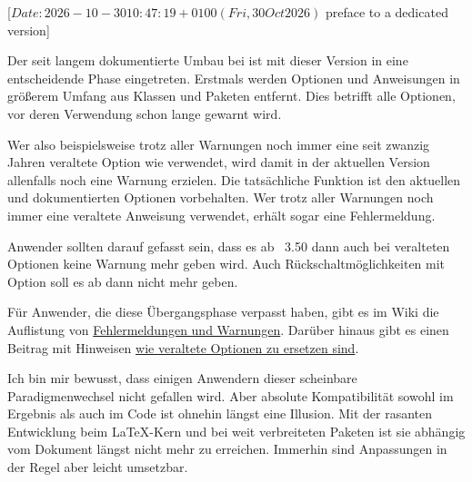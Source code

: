 %
%
%
%
%

                 [$Date: 2026-10-30 10:47:19 +0100 (Fri, 30 Oct 2026) $
                  preface to a dedicated version]


Der seit langem dokumentierte Umbau bei \KOMAScript{} ist mit dieser Version
in eine entscheidende Phase eingetreten. Erstmals werden Optionen und
Anweisungen in größerem Umfang aus Klassen und Paketen entfernt. Dies betrifft
alle Optionen, vor deren Verwendung schon lange gewarnt wird.

Wer also beispielsweise trotz aller Warnungen noch immer eine seit zwanzig
Jahren veraltete Option wie  verwendet, wird damit in
der aktuellen Version allenfalls noch eine Warnung erzielen. Die tatsächliche
Funktion ist den aktuellen und dokumentierten Optionen vorbehalten.
Wer trotz aller Warnungen noch immer eine veraltete Anweisung verwendet,
erhält sogar eine Fehlermeldung.

Anwender sollten darauf gefasst sein, dass es ab \KOMAScript~3.50 dann auch
bei veralteten Optionen keine Warnung mehr geben wird. Auch
Rückschaltmöglichkeiten mit Option  soll es ab dann nicht mehr
geben.

Für Anwender, die diese Übergangsphase verpasst haben, gibt es im Wiki die
Auflistung von
\href{https://sourceforge.net/p/koma-script/wiki-de/Messages/}{Fehlermeldungen
  und Warnungen}. Darüber hinaus gibt es einen Beitrag mit Hinweisen
\href{https://sourceforge.net/p/koma-script/wiki-de/HowTo_DeprecatedOptions/}{wie
  veraltete Optionen zu ersetzen sind}.

Ich bin mir bewusst, dass einigen Anwendern dieser scheinbare
Paradigmenwechsel nicht gefallen wird. Aber absolute Kompatibilität sowohl im
Ergebnis als auch im Code ist ohnehin längst eine Illusion. Mit der rasanten
Entwicklung beim \LaTeX-Kern und bei weit verbreiteten Paketen ist sie
abhängig vom Dokument längst nicht mehr zu erreichen. Immerhin sind
Anpassungen in der Regel aber leicht umsetzbar.

